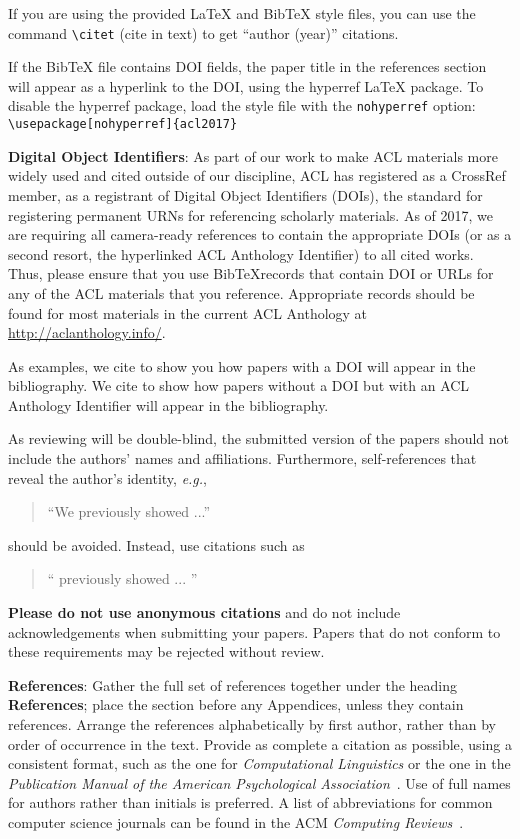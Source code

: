 \documentclass[11pt,a4paper]{article}
\begin{document}
If you are using the provided \LaTeX{} and Bib\TeX{} style files, you
can use the command \verb|\citet| (cite in text)
to get ``author (year)'' citations.

If the Bib\TeX{} file contains DOI fields, the paper
title in the references section will appear as a hyperlink
to the DOI, using the hyperref \LaTeX{} package.
To disable the hyperref package, load the style file
with the \verb|nohyperref| option:
\verb|\usepackage[nohyperref]{acl2017}|

\textbf{Digital Object Identifiers}:  As part of our work to make ACL
materials more widely used and cited outside of our discipline, ACL
has registered as a CrossRef member, as a registrant of Digital Object
Identifiers (DOIs), the standard for registering permanent URNs for
referencing scholarly materials.  As of 2017, we are requiring all
camera-ready references to contain the appropriate DOIs (or as a
second resort, the hyperlinked ACL Anthology Identifier) to all cited
works.  Thus, please ensure that you use Bib\TeX records that contain
DOI or URLs for any of the ACL materials that you reference.
Appropriate records should be found for most materials in the current
ACL Anthology at \url{http://aclanthology.info/}.

As examples, we cite \cite{P16-1001} to show you how papers with a DOI
will appear in the bibliography.  We cite \cite{C14-1001} to show how
papers without a DOI but with an ACL Anthology Identifier will appear
in the bibliography.  

As reviewing will be double-blind, the submitted version of the papers
should not include the authors' names and affiliations. Furthermore,
self-references that reveal the author's identity, {\em e.g.},
\begin{quote}
``We previously showed \cite{Gusfield:97} ...''  
\end{quote}
should be avoided. Instead, use citations such as 
\begin{quote}
``\citeauthor{Gusfield:97} 
previously showed ... ''
\end{quote}

\textbf{Please do not use anonymous citations} and do not include
acknowledgements when submitting your papers. Papers that do not
conform to these requirements may be rejected without review.

\textbf{References}: Gather the full set of references together under
the heading {\bf References}; place the section before any Appendices,
unless they contain references. Arrange the references alphabetically
by first author, rather than by order of occurrence in the text.
Provide as complete a citation as possible, using a consistent format,
such as the one for {\em Computational Linguistics\/} or the one in the 
{\em Publication Manual of the American 
Psychological Association\/}~\cite{APA:83}.  Use of full names for
authors rather than initials is preferred.  A list of abbreviations
for common computer science journals can be found in the ACM 
{\em Computing Reviews\/}~\cite{ACM:83}.
\end{document}
